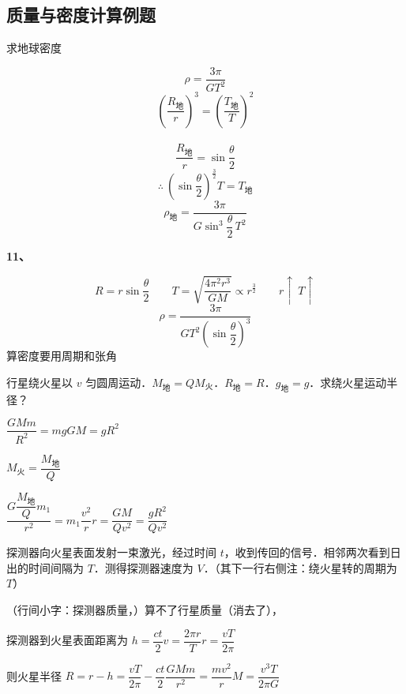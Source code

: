 \subsection{质量与密度计算例题}
\begin{problem}
求地球密度
\begin{solution}
\[ \rho=\dfrac{3\pi}{GT^2} \]
\[ \left(\dfrac{R_{\text{地}}}{r}\right)^3=\left(\dfrac{T_{\text{地}}}{T}\right)^2 \]
　
\[ \dfrac{R_{\text{地}}}{r}=\sin\dfrac{\theta}{2} \]
\[ \therefore\ \left(\sin\dfrac{\theta}{2}\right)^{\frac{3}{2}}T=T_{\text{地}} \] %
\[ \rho_{\text{地}}=\dfrac{3\pi}{G\sin^{3}\dfrac{\theta}{2}\,T^2} \]
\end{solution}
\end{problem}

\begin{problem}[11]
\textbf{11、}
\begin{solution}
\[ R=r\sin\dfrac{\theta}{2}\qquad T=\sqrt{\dfrac{4\pi^2r^3}{GM}}\propto r^{\frac{3}{2}}\qquad r\uparrow\ T\uparrow \] %
\[ \rho=\dfrac{3\pi}{GT^2\left(\sin\dfrac{\theta}{2}\right)^3} \]
算密度要用周期和张角
\end{solution}
\end{problem}

\begin{problem}[3]
行星绕火星以 $v$ 匀圆周运动．$M_{\text{地}}=QM_{\text{火}}$．$R_{\text{地}}=R$．$g_{\text{地}}=g$．求绕火星运动半径？
\begin{solution}
$\dfrac{GMm}{R^2}=mg$\quad $GM=gR^2$

$M_{\text{火}}=\dfrac{M_{\text{地}}}{Q}$

$\dfrac{G\dfrac{M_{\text{地}}}{Q}m_1}{r^2}=m_1\dfrac{v^2}{r}$\quad $r=\dfrac{GM}{Qv^2}=\dfrac{gR^2}{Qv^2}$
\end{solution}
\end{problem}

\begin{problem}[7]
探测器向火星表面发射一束激光，经过时间 $t$，收到传回的信号．相邻两次看到日出的时间间隔为 $T$．测得探测器速度为 $V$．（其下一行右侧注：绕火星转的周期为 $T$）%
\begin{solution}
（行间小字：探测器质量，）算不了行星质量（消去了），%

探测器到火星表面距离为 $h=\dfrac{ct}{2}$\quad $v=\dfrac{2\pi r}{T}$\quad $r=\dfrac{vT}{2\pi}$

则火星半径 $R=r-h=\dfrac{vT}{2\pi}-\dfrac{ct}{2}$\quad $\dfrac{GMm}{r^2}=\dfrac{mv^2}{r}$\quad $M=\dfrac{v^3T}{2\pi G}$%
\end{solution}
\end{problem}

